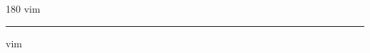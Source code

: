 
\begin{frame}
\begin{center}
\begin{turn}{180}
{\fontsize{2.5cm}{1em}\selectfont vim}
\end{turn}
\vspace{1em}\par  
\hrule
\vspace{1em}\par  
{\fontsize{2.5cm}{1em}\selectfont vim}
\end{center}
\end{frame}
